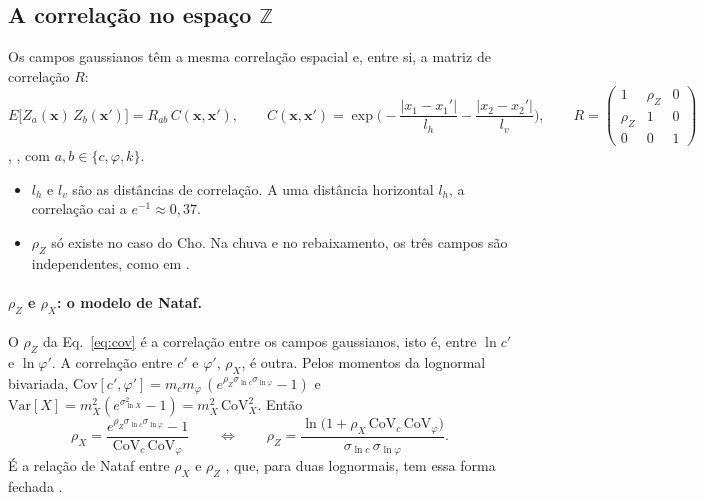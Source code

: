 \documentclass[11pt,a4paper]{article}
\newcommand{\Z}{\mathbb{Z}}
\begin{document}
\subsection{A correlação no espaço $\Z$}\label{sec:corr}
Os campos gaussianos têm a mesma correlação espacial \citep{fenton2003, cho2010} e, entre si, a matriz de correlação
$R$:
\begin{equation}
  E\big[Z_a(\bm x)\,Z_b(\bm x')\big] = R_{ab}\,C(\bm x, \bm x'), \qquad
  C(\bm x, \bm x') = \exp\Big(-\frac{|x_1 - x_1'|}{l_h} - \frac{|x_2 - x_2'|}{l_v}\Big), \qquad
  R = \begin{pmatrix} 1 & \rho_Z & 0\\ \rho_Z & 1 & 0\\ 0 & 0 & 1 \end{pmatrix}
  \label{eq:cov}
\end{equation}
\citep[Eq.~7]{cho2010}, \citep[Eq.~64]{ceron2025}, com $a, b \in \{c, \varphi, k\}$.
\begin{itemize}
  \item $l_h$ e $l_v$ são as distâncias de correlação. A uma distância horizontal $l_h$, a correlação cai a
    $e^{-1} \approx 0{,}37$.
  \item $\rho_Z$ só existe no caso do Cho. Na chuva e no rebaixamento, os três campos são independentes, como em
    \citet[Seç.~5.1.1]{ceron2025}.
\end{itemize}

\paragraph{$\rho_Z$ e $\rho_X$: o modelo de Nataf.} O $\rho_Z$ da Eq.~\eqref{eq:cov} é a correlação entre os campos
gaussianos, isto é, entre $\ln c'$ e $\ln\varphi'$. A correlação entre $c'$ e $\varphi'$, $\rho_X$, é outra. Pelos
momentos da lognormal bivariada,
$\mathrm{Cov}[c', \varphi'] = m_c m_\varphi\,(e^{\rho_Z\sigma_{\ln c}\sigma_{\ln\varphi}} - 1)$ e
$\mathrm{Var}[X] = m_X^2(e^{\sigma_{\ln X}^2} - 1) = m_X^2\,\mathrm{CoV}_X^2$. Então
\begin{equation}
  \rho_X = \frac{e^{\rho_Z\sigma_{\ln c}\sigma_{\ln\varphi}} - 1}{\mathrm{CoV}_c\,\mathrm{CoV}_\varphi}
  \qquad\Longleftrightarrow\qquad
  \rho_Z = \frac{\ln\big(1 + \rho_X\,\mathrm{CoV}_c\,\mathrm{CoV}_\varphi\big)}{\sigma_{\ln c}\,\sigma_{\ln\varphi}}.
  \label{eq:nataf}
\end{equation}
É a relação de Nataf entre $\rho_X$ e $\rho_Z$ \citep[Eqs.~4.53 a 4.55]{beck2014}, que, para duas lognormais, tem essa
forma fechada \citep{derkiureghian1986}.
\end{document}

